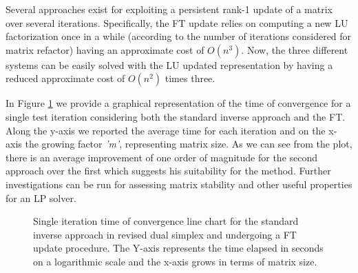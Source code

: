 \documentclass[journal,article,submit,electronics,pdftex]{Definitions/mdpi}
\begin{document}
{Several approaches exist for exploiting a persistent rank-1 update of a matrix over several iterations. Specifically, the FT update relies on computing a new LU factorization once in a while (according to the number of iterations considered for matrix refactor) having an approximate cost of $O(n^3)$. Now, the three different systems can be easily solved with the LU updated representation by having a reduced approximate cost of $O(n^2)$ times three.

In Figure \ref{fig:ft} we provide a graphical representation of the time of convergence for a single test iteration considering both the standard inverse approach and the FT. Along the y-axis we reported the average time for each iteration and on the x-axis the growing factor \emph{'m'}, representing matrix size. As we can see from the plot, there is an average improvement of one order of magnitude for the second approach over the first which suggests his suitability for the method. Further investigations can be run for assessing matrix stability and other useful properties for an LP solver.

\begin{figure}[H]
\centering
{}
\caption{ Single iteration time of convergence line chart for the standard inverse approach in revised dual simplex and undergoing a FT update procedure. The Y-axis represents the time elapsed in seconds on a logarithmic scale and the x-axis grows in terms of matrix size.}
\label{fig:ft}
\end{figure}



\clearpage

\appendix
}
\end{document}
